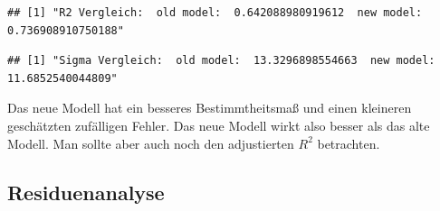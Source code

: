\documentclass[]{article}
\newenvironment{Shaded}{\begin{snugshade}}{\end{snugshade}}
\newcommand{\DataTypeTok}[1]{\textcolor[rgb]{0.13,0.29,0.53}{#1}}
\newcommand{\KeywordTok}[1]{\textcolor[rgb]{0.13,0.29,0.53}{\textbf{#1}}}
\newcommand{\NormalTok}[1]{#1}
\newcommand{\OperatorTok}[1]{\textcolor[rgb]{0.81,0.36,0.00}{\textbf{#1}}}
\newcommand{\StringTok}[1]{\textcolor[rgb]{0.31,0.60,0.02}{#1}}
\begin{document}
\begin{Shaded}
\end{Shaded}

\begin{verbatim}
## [1] "R2 Vergleich:  old model:  0.642088980919612  new model:  0.736908910750188"
\end{verbatim}

\begin{Shaded}
\end{Shaded}

\begin{verbatim}
## [1] "Sigma Vergleich:  old model:  13.3296898554663  new model:  11.6852540044809"
\end{verbatim}

Das neue Modell hat ein besseres Bestimmtheitsmaß und einen kleineren geschätzten zufälligen Fehler.
Das neue Modell wirkt also besser als das alte Modell. Man sollte aber auch noch den adjustierten \(R^2\) betrachten.

\hypertarget{residuenanalyse}{%
\subsection{Residuenanalyse}\label{residuenanalyse}}

\begin{Shaded}
\end{Shaded}
\end{document}
